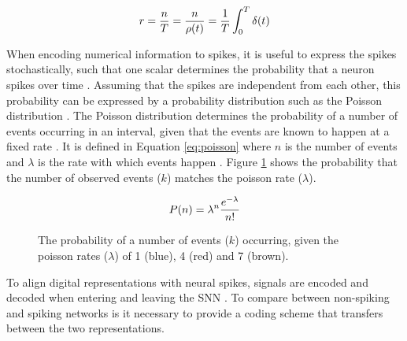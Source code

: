 \documentclass[report.tex]{subfiles}
\begin{document}
\begin{equation}
  r = {n \over T} = {n \over \rho(t)} = {1 \over T} \int_0^T \delta(t)
\label{eq:spikerate}
\end{equation}

When encoding numerical information to spikes, it is useful to 
express the spikes stochastically, such that one scalar determines
the probability that a neuron spikes over time \cite{Dayan2001}.
Assuming that the spikes are independent from each other, this
probability can be expressed by a probability distribution such as the
Poisson distribution
\cite{Dayan2001}.
The Poisson distribution determines the probability of a number
of events occurring in an interval, given that the events are
known to happen at a fixed rate \cite{Dayan2001}.
It is defined in Equation \ref{eq:poisson} where $n$ is the
number of events and $\lambda$ is the rate with which events
happen \cite{Dayan2001}.
Figure \ref{fig:poisson} shows the probability that the number of
observed events ($k$) matches the poisson rate ($\lambda$).

\begin{equation}
P(n) = \lambda^n {e^{-\lambda} \over n!}
\label{eq:poisson}
\end{equation}

\begin{figure}
\centering
{}
\caption{The probability of a number of events ($k$) occurring, given the
poisson rates ($\lambda$) of 1 (blue), 4 (red) and 7 (brown).}
\label{fig:poisson}
\end{figure}

To align digital representations with neural spikes,
signals are encoded and decoded when entering and leaving the \gls{SNN}
\cite{Dayan2001}.
To compare between non-spiking and spiking networks is it necessary to 
provide a coding scheme that transfers between the two representations.
\end{document}
